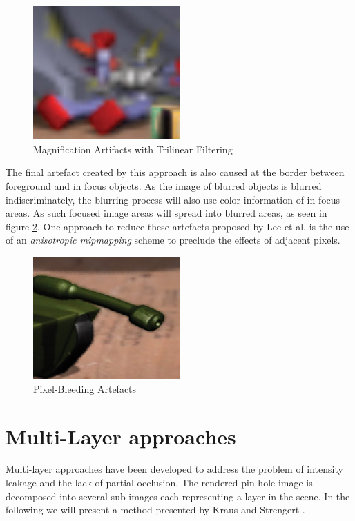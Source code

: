 \begin{figure}[h]
    \centering
    \includegraphics[width=0.5\textwidth]{images/trilinear-filtering.jpg}
    \caption{Magnification Artifacts with Trilinear Filtering \cite{Demers.2005}}
    \label{fig:trilinear-filtering}
\end{figure}

The final artefact created by this approach is also caused at the border between foreground and in focus objects.
As the image of blurred objects is blurred indiscriminately, the blurring process will also use color information of in focus areas.
As such focused image areas will spread into blurred areas, as seen in figure \ref{fig:pxl-bleeeding}.\cite{Demers.2005}
One approach to reduce these artefacts proposed by Lee et al. \cite{Lee.2009} is the use of an \textit{anisotropic mipmapping} scheme to preclude the effects of adjacent pixels.

\begin{figure}[h]
    \centering
    \includegraphics[width=0.5\textwidth]{images/pixel-bleeding.jpg}
    \caption{Pixel-Bleeding Artefacts \cite{Demers.2005}}
    \label{fig:pxl-bleeeding}
\end{figure}

\section{Multi-Layer approaches}
Multi-layer approaches have been developed to address the problem of intensity leakage and the lack of partial occlusion.
The rendered pin-hole image is decomposed into several sub-images each representing a layer in the scene.
In the following we will present a method presented by Kraus and Strengert \cite{Kraus.2007}.

